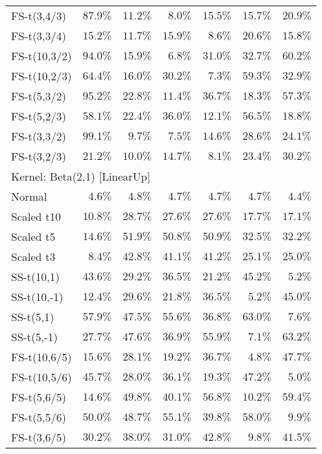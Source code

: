 \begin{longtable}{lrrrrrr}
FS-t(3,4/3) & $87.9\%$ & $11.2\%$ & $8.0\%$ & $15.5\%$ & $15.7\%$ & $20.9\%$ \\ 
FS-t(3,3/4) & $15.2\%$ & $11.7\%$ & $15.9\%$ & $8.6\%$ & $20.6\%$ & $15.8\%$ \\ 
FS-t(10,3/2) & $94.0\%$ & $15.9\%$ & $6.8\%$ & $31.0\%$ & $32.7\%$ & $60.2\%$ \\ 
FS-t(10,2/3) & $64.4\%$ & $16.0\%$ & $30.2\%$ & $7.3\%$ & $59.3\%$ & $32.9\%$ \\ 
FS-t(5,3/2) & $95.2\%$ & $22.8\%$ & $11.4\%$ & $36.7\%$ & $18.3\%$ & $57.3\%$ \\ 
FS-t(5,2/3) & $58.1\%$ & $22.4\%$ & $36.0\%$ & $12.1\%$ & $56.5\%$ & $18.8\%$ \\ 
FS-t(3,3/2) & $99.1\%$ & $9.7\%$ & $7.5\%$ & $14.6\%$ & $28.6\%$ & $24.1\%$ \\ 
FS-t(3,2/3) & $21.2\%$ & $10.0\%$ & $14.7\%$ & $8.1\%$ & $23.4\%$ & $30.2\%$ \\ 
\midrule
\multicolumn{7}{l}{Kernel: Beta(2,1) [LinearUp]} \\ 
\midrule
Normal & $4.6\%$ & $4.8\%$ & $4.7\%$ & $4.7\%$ & $4.7\%$ & $4.4\%$ \\ 
Scaled t10 & $10.8\%$ & $28.7\%$ & $27.6\%$ & $27.6\%$ & $17.7\%$ & $17.1\%$ \\ 
Scaled t5 & $14.6\%$ & $51.9\%$ & $50.8\%$ & $50.9\%$ & $32.5\%$ & $32.2\%$ \\ 
Scaled t3 & $8.4\%$ & $42.8\%$ & $41.1\%$ & $41.2\%$ & $25.1\%$ & $25.0\%$ \\ 
SS-t(10,1) & $43.6\%$ & $29.2\%$ & $36.5\%$ & $21.2\%$ & $45.2\%$ & $5.2\%$ \\ 
SS-t(10,-1) & $12.4\%$ & $29.6\%$ & $21.8\%$ & $36.5\%$ & $5.2\%$ & $45.0\%$ \\ 
SS-t(5,1) & $57.9\%$ & $47.5\%$ & $55.6\%$ & $36.8\%$ & $63.0\%$ & $7.6\%$ \\ 
SS-t(5,-1) & $27.7\%$ & $47.6\%$ & $36.9\%$ & $55.9\%$ & $7.1\%$ & $63.2\%$ \\ 
FS-t(10,6/5) & $15.6\%$ & $28.1\%$ & $19.2\%$ & $36.7\%$ & $4.8\%$ & $47.7\%$ \\ 
FS-t(10,5/6) & $45.7\%$ & $28.0\%$ & $36.1\%$ & $19.3\%$ & $47.2\%$ & $5.0\%$ \\ 
FS-t(5,6/5) & $14.6\%$ & $49.8\%$ & $40.1\%$ & $56.8\%$ & $10.2\%$ & $59.4\%$ \\ 
FS-t(5,5/6) & $50.0\%$ & $48.7\%$ & $55.1\%$ & $39.8\%$ & $58.0\%$ & $9.9\%$ \\ 
FS-t(3,6/5) & $30.2\%$ & $38.0\%$ & $31.0\%$ & $42.8\%$ & $9.8\%$ & $41.5\%$ \\ 

\end{longtable}
